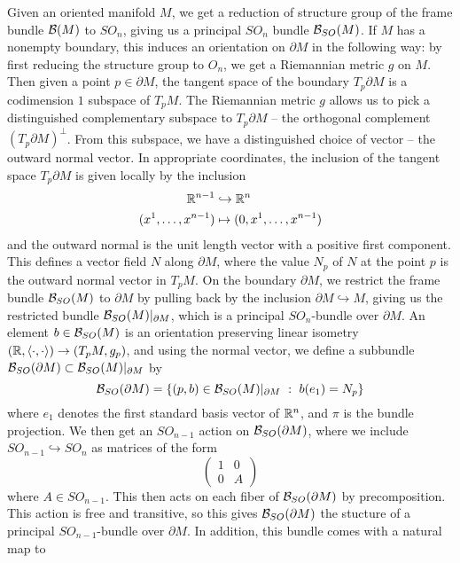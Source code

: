 %
Given an oriented manifold $M$, we get a reduction of structure group
of the frame bundle $\mathcal{B}(M)$ to $SO_n$, giving us a principal $SO_n$ bundle
$\mathcal{B}_{SO}(M)$. If $M$ has a nonempty boundary, this induces an orientation on
$\partial M$ in the following way: by first reducing the structure group to $O_n$,
we get a Riemannian metric $g$ on $M$. Then given a point $p \in \partial M$,
the tangent space of the boundary $T_p\partial M$ is a codimension $1$ subspace
of $T_pM$. The Riemannian metric $g$ allows us to pick a distinguished complementary
subspace to $T_p\partial M$ -- the orthogonal complement $(T_p \partial M)^\perp$.
From this subspace, we have a distinguished choice of vector -- the outward
normal vector. In appropriate coordinates, the inclusion of the tangent space
$T_p\partial M$ is given locally by the inclusion
%
\begin{align*}
\mathbb{R}^{n-1} &\hookrightarrow \mathbb{R}^n \\
(x^1, \ldots, x^{n-1}) &\mapsto (0, x^1, \ldots, x^{n-1})
\end{align*}
%
and the outward normal is the unit length vector with a positive first component.
This defines a vector field $N$ along $\partial M$, where the value $N_p$
of $N$ at the point $p$ is the outward normal vector in $T_pM$.
On the boundary $\partial M$, we restrict the frame bundle $\mathcal{B}_{SO}(M)$
to $\partial M$ by pulling back by the inclusion $\partial M \hookrightarrow M$,
giving us the restricted bundle $\mathcal{B}_{SO}(M)\vert_{\partial M}$, which is a principal
$SO_n$-bundle over $\partial M$. An element $b \in \mathcal{B}_{SO}(M)$ is an orientation
preserving linear isometry $(\mathbb{R}, \langle \cdot,\cdot\rangle) \to (T_pM, g_p)$, and
using the normal vector, we define a subbundle
$\mathcal{B}_{SO}(\partial M) \subset \mathcal{B}_{SO}(M)\vert_{\partial M}$ by
\[
\mathcal{B}_{SO}(\partial M) = \left\lbrace (p,b) \in \mathcal{B}_{SO}(M)\vert_{\partial M} ~:~
b(e_1) = N_p \right\rbrace
\]
where $e_1$ denotes the first standard basis vector of $\mathbb{R}^n$, and $\pi$ is
the bundle projection. We then get an $SO_{n-1}$ action on $\mathcal{B}_{SO}(\partial M)$,
where we include $SO_{n-1} \hookrightarrow SO_n$ as matrices of the form
\[
\begin{pmatrix}
1 & 0 \\
0 & A
\end{pmatrix}
\]
where $A \in SO_{n-1}$. This then acts on each fiber of $\mathcal{B}_{SO}(\partial M)$
by precomposition. This action is free and transitive, so this gives
$\mathcal{B}_{SO}(\partial M)$ the stucture of a principal $SO_{n-1}$-bundle over
$\partial M$. In addition, this bundle comes with a natural map to
